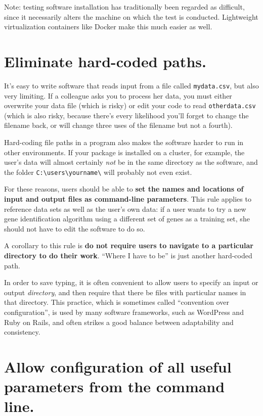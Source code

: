 \documentclass[10pt,letterpaper]{article}
\begin{document}
Note:
testing software installation has traditionally been regarded as difficult,
since it necessarily alters the machine on which the test is conducted.
Lightweight virtualization containers like Docker make this much easier as well.

\section{Eliminate hard-coded paths.}

It's easy to write software that reads input from a file called
\texttt{mydata.csv}, but also very limiting. If a colleague asks you to
process her data, you must either overwrite your data file (which is
risky) or edit your code to read \texttt{otherdata.csv} (which is also
risky, because there's every likelihood you'll forget to change the
filename back, or will change three uses of the filename but not a
fourth).

Hard-coding file paths in a program also makes the software harder to run
in other environments. If your package is installed on a cluster, for
example, the user's data will almost certainly \emph{not} be in the same
directory as the software, and the folder
\texttt{C:\textbackslash{}users\textbackslash{}yourname\textbackslash{}}
will probably not even exist.

For these reasons, users should be able to
\textbf{set the names and locations of input and output files as command-line parameters}.
This rule applies to reference data sets as well as the user's own
data: if a user wants to try a new gene identification algorithm using
a different set of genes as a training set, she should not have to
edit the software to do so.

A corollary to this rule is
\textbf{do not require users to navigate to a particular directory to do their work}.
``Where I have to be'' is just another hard-coded path.

In order to save typing, it is often convenient to allow users to
specify an input or output \emph{directory}, and then require that there
be files with particular names in that directory. This practice, which
is sometimes called ``convention over configuration'', is used by many
software frameworks, such as WordPress and Ruby on Rails, and often
strikes a good balance between adaptability and consistency.

\section{Allow configuration of all useful parameters from the command line.}
\end{document}
